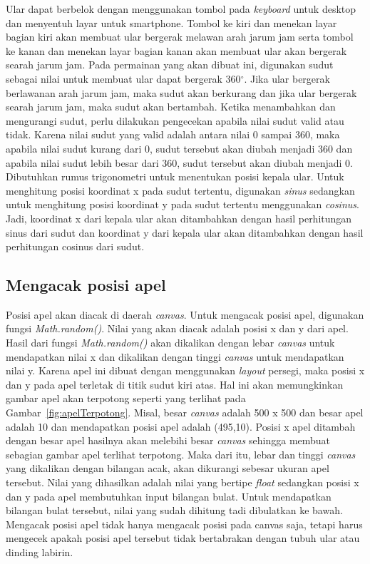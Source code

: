 Ular dapat berbelok dengan menggunakan tombol pada \textit{keyboard} untuk desktop dan menyentuh layar untuk smartphone. Tombol ke kiri dan menekan layar bagian kiri akan membuat ular bergerak melawan arah jarum jam serta tombol ke kanan dan menekan layar bagian kanan akan membuat ular akan bergerak searah jarum jam. Pada permainan yang akan dibuat ini, digunakan sudut sebagai nilai untuk membuat ular dapat bergerak 360$^\circ$. Jika ular bergerak berlawanan arah jarum jam, maka sudut akan berkurang dan jika ular bergerak searah jarum jam, maka sudut akan bertambah. Ketika menambahkan dan mengurangi sudut, perlu dilakukan pengecekan apabila nilai sudut valid atau tidak. Karena nilai sudut yang valid adalah antara nilai 0 sampai 360, maka apabila nilai sudut kurang dari 0, sudut tersebut akan diubah menjadi 360 dan apabila nilai sudut lebih besar dari 360, sudut tersebut akan diubah menjadi 0. Dibutuhkan rumus trigonometri untuk menentukan posisi kepala ular. Untuk menghitung posisi koordinat x pada sudut tertentu, digunakan \textit{sinus} sedangkan untuk menghitung posisi koordinat y pada sudut tertentu menggunakan \textit{cosinus}. Jadi, koordinat x dari kepala ular akan ditambahkan dengan hasil perhitungan sinus dari sudut dan koordinat y dari kepala ular akan ditambahkan dengan hasil perhitungan cosinus dari sudut.

\subsection{Mengacak posisi apel}
Posisi apel akan diacak di daerah \textit{canvas}. Untuk mengacak posisi apel, digunakan fungsi \textit{Math.random()}. Nilai yang akan diacak adalah posisi x dan y dari apel. Hasil dari fungsi \textit{Math.random()} akan dikalikan dengan lebar \textit{canvas} untuk mendapatkan nilai x dan dikalikan dengan tinggi \textit{canvas} untuk mendapatkan nilai y. Karena apel ini dibuat dengan menggunakan \textit{layout} persegi, maka posisi x dan y pada apel terletak di titik sudut kiri atas. Hal ini akan memungkinkan gambar apel akan terpotong seperti yang terlihat pada Gambar~\ref{fig:apelTerpotong}. Misal, besar \textit{canvas} adalah 500 x 500 dan besar apel adalah 10 dan mendapatkan posisi apel adalah (495,10). Posisi x apel ditambah dengan besar apel hasilnya akan melebihi besar \textit{canvas} sehingga membuat sebagian gambar apel terlihat terpotong. Maka dari itu, lebar dan tinggi \textit{canvas} yang dikalikan dengan bilangan acak, akan dikurangi sebesar ukuran apel tersebut.  Nilai yang dihasilkan adalah nilai yang bertipe \textit{float} sedangkan posisi x dan y pada apel membutuhkan input bilangan bulat. Untuk mendapatkan bilangan bulat tersebut, nilai yang sudah dihitung tadi dibulatkan ke bawah. Mengacak posisi apel tidak hanya mengacak posisi pada canvas saja, tetapi harus mengecek apakah posisi apel tersebut tidak bertabrakan dengan tubuh ular atau dinding labirin. 

